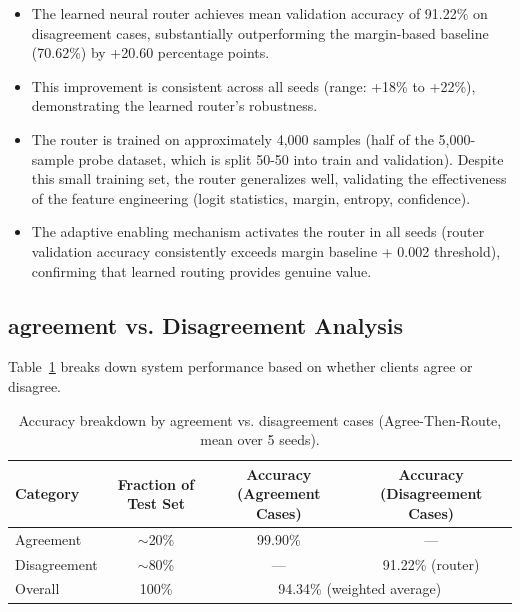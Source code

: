 \documentclass[12pt]{article}
\begin{document}
\begin{itemize}
    \item The learned neural router achieves mean validation accuracy of 91.22\% on disagreement cases, substantially outperforming the margin-based baseline (70.62\%) by +20.60 percentage points.
    
    \item This improvement is consistent across all seeds (range: +18\% to +22\%), demonstrating the learned router's robustness.
    
    \item The router is trained on approximately 4,000 samples (half of the 5,000-sample probe dataset, which is split 50-50 into train and validation). Despite this small training set, the router generalizes well, validating the effectiveness of the feature engineering (logit statistics, margin, entropy, confidence).
    
    \item The adaptive enabling mechanism activates the router in all seeds (router validation accuracy consistently exceeds margin baseline + 0.002 threshold), confirming that learned routing provides genuine value.
\end{itemize}

\subsection{agreement vs. Disagreement Analysis}

Table~\ref{tab:agreement_analysis} breaks down system performance based on whether clients agree or disagree.

\begin{table}[h]
\centering
\caption{Accuracy breakdown by agreement vs. disagreement cases (Agree-Then-Route, mean over 5 seeds).}
\label{tab:agreement_analysis}
\begin{tabular}{lccc}
\toprule
\textbf{Category} & \textbf{Fraction of Test Set} & \textbf{Accuracy (Agreement Cases)} & \textbf{Accuracy (Disagreement Cases)} \\
\midrule
Agreement & $\sim$20\% & 99.90\% & --- \\
Disagreement & $\sim$80\% & --- & 91.22\% (router) \\
Overall & 100\% & \multicolumn{2}{c}{94.34\% (weighted average)} \\
\bottomrule
\end{tabular}
\end{table}
\end{document}
